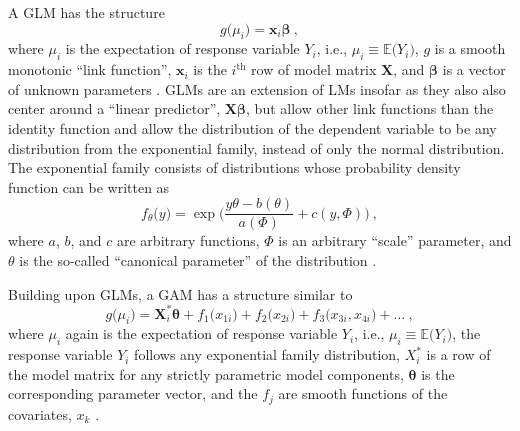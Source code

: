 A GLM has the structure
\begin{equation}
  \label{eq:GeneralizedLinearModel}
  g\bigl(\mu_i\bigr) = \mathbf{x}_i \symbf{\beta}~,  %
\end{equation}
where \(\mu_i\) is the expectation of response variable \(Y_i\), i.e., \(\mu_i \equiv \mathbb{E}\bigl(Y_i\bigr)\), \(g\) is a smooth monotonic ``link function'', \(\mathbf{x}_i\) is the \(i^{\text{th}}\) row of model matrix \(\mathbf{X}\), and \(\symbf{\beta}\) is a vector of unknown parameters \parencite{Wood2006}.
GLMs are an extension of LMs insofar as they also also center around a ``linear predictor'', \(\mathbf{X}\symbf{\beta}\), but allow other link functions than the identity function and allow the distribution of the dependent variable to be any distribution from the exponential family, instead of only the normal distribution.  The exponential family consists of distributions whose probability density function can be written as
\begin{equation}
  \label{eq:ExponentialFamilyProbabilityDensityFunction}
  f_{\theta}\bigl(y\bigr) = \exp \bigg( \frac{y \theta - b(\theta)}{a(\Phi)} + c(y, \Phi)\bigg)~,
\end{equation}
where \(a\), \(b\), and \(c\) are arbitrary functions, \(\Phi\) is an arbitrary ``scale'' parameter, and \(\theta\) is the so-called ``canonical parameter'' of the distribution \parencite{Wood2006}.

Building upon GLMs, a GAM has a structure similar to
\begin{equation}
  \label{eq:GeneralizedAdditiveModel}
  g\bigl(\mu_i\bigr) = \symbf{X}_i^* \symbf{\theta} + f_{1}\bigl(x_{1i}\bigr) + f_{2}\bigl(x_{2i}\bigr) + f_{3}\bigl(x_{3i}, x_{4i}\bigr) + \ldots~,
\end{equation}
where \(\mu_i\) again is the expectation of response variable \(Y_i\), i.e., \(\mu_i \equiv \mathbb{E}\bigl(Y_i\bigr)\), the response variable \(Y_i\) follows any exponential family distribution, \(X_i^*\) is a row of the model matrix for any strictly parametric model components, \(\symbf{\theta}\) is the corresponding parameter vector, and the \(f_j\) are smooth functions of the covariates, \(x_k\) \parencite{Wood2006}.  %

